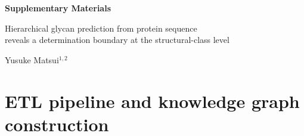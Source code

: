 \documentclass[11pt,a4paper]{article}
\begin{document}
\begin{center}
{\LARGE\bfseries Supplementary Materials}

\vspace{0.5em}
{\large Hierarchical glycan prediction from protein sequence\\
reveals a determination boundary at the structural-class level}

\vspace{0.5em}
{\normalsize Yusuke Matsui$^{1,2}$}
\end{center}

\vspace{1em}
\tableofcontents
\vspace{1em}

\section{ETL pipeline and knowledge graph construction}
\label{sec:etl}
\end{document}
